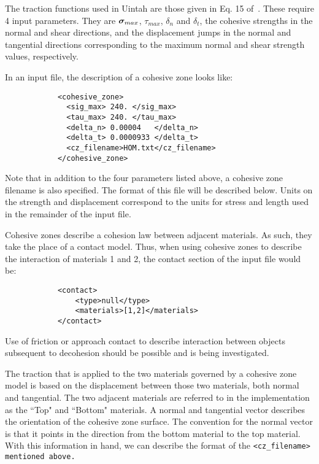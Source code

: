 The traction functions used in Uintah are those given in Eq. 15
of~\cite{Daphalapurkar}.  These require 4 input parameters.  They are
$\sig_{max}$, $\tau_{max}$, $\delta_n$ and $\delta_t$, the cohesive strengths
in the normal and shear directions, and the displacement jumps in the normal and
tangential directions corresponding to the maximum normal and shear strength
values, respectively.

In an input file, the description of a cohesive zone looks like:

\begin{Verbatim}
            <cohesive_zone>
              <sig_max> 240. </sig_max>
              <tau_max> 240. </tau_max>
              <delta_n> 0.00004   </delta_n>
              <delta_t> 0.0000933 </delta_t>
              <cz_filename>HOM.txt</cz_filename>
            </cohesive_zone>
\end{Verbatim}

Note that in addition to the four parameters listed above, a cohesive zone
filename is also specified.  The format of this file will be described below.
Units on the strength and displacement correspond to the units for
stress and length used in the remainder of the input file.

Cohesive zones describe a cohesion law between adjacent materials. As such,
they take the place of a contact model.  Thus, when using cohesive zones to
describe the interaction of materials 1 and 2, the contact section of the input
file would be:

\begin{Verbatim}
            <contact>
                <type>null</type>
                <materials>[1,2]</materials>
            </contact>
\end{Verbatim}

Use of friction or approach contact to describe interaction between objects
subsequent to decohesion should be possible and is being investigated.

The traction that is applied to the two materials governed by a
cohesive zone model is based on the displacement between those two materials,
both normal and tangential.  The two adjacent materials are referred to in the
implementation as the ``Top" and ``Bottom" materials.  A normal and tangential
vector describes the orientation of the cohesive zone surface.  The convention
for the normal vector is that it points in the direction from the bottom
material to the top material.  With this information in hand, we can describe
the format of the \tt <cz\_filename> \normalfont mentioned above.


